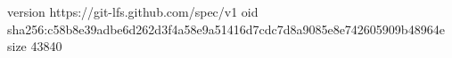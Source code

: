 version https://git-lfs.github.com/spec/v1
oid sha256:c58b8e39adbe6d262d3f4a58e9a51416d7cdc7d8a9085e8e742605909b48964e
size 43840
